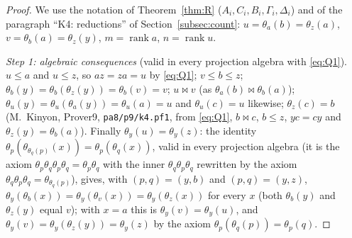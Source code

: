 \documentclass[11pt]{amsart}
\theoremstyle{definition}
\newcommand{\rk}{\operatorname{rank}}
\newcommand{\mt}{\bowtie}   %
\begin{document}
\begin{proof}
We use the notation of Theorem~\ref{thm:R} ($A_i,C_i,B_i,\Gamma_i,\Delta_i$) and of the paragraph ``K4: reductions'' of Section~\ref{subsec:count}: $u=\theta_a(b)=\theta_z(a)$, $v=\theta_b(a)=\theta_z(y)$, $m=\rk a$, $n=\rk u$.

\smallskip\emph{Step 1: algebraic consequences} (valid in every projection algebra with \eqref{eq:Q1}). $u\le a$ and $u\le z$, so $az=za=u$ by \eqref{eq:Q1}; $v\le b\le z$; $\theta_b(y)=\theta_b(\theta_z(y))=\theta_b(v)=v$; $u\mt v$ (as $\theta_a(b)\mt\theta_b(a)$); $\theta_u(y)=\theta_u(\theta_a(y))=\theta_u(a)=u$ and $\theta_u(c)=u$ likewise; $\theta_z(c)=b$ (M.~Kinyon, Prover9, \texttt{pa8/p9/k4.pf1}, from \eqref{eq:Q1}, $b\mt c$, $b\le z$, $yc=cy$ and $\theta_z(y)=\theta_b(a)$). Finally $\theta_y(u)=\theta_y(z)$: the identity $\theta_p(\theta_{\theta_q(p)}(x))=\theta_p(\theta_q(x))$, valid in every projection algebra (it is the axiom $\theta_p\theta_q\theta_p\theta_q=\theta_p\theta_q$ with the inner $\theta_q\theta_p\theta_q$ rewritten by the axiom $\theta_q\theta_p\theta_q=\theta_{\theta_q(p)}$), gives, with $(p,q)=(y,b)$ and $(p,q)=(y,z)$, $\theta_y(\theta_b(x))=\theta_y(\theta_v(x))=\theta_y(\theta_z(x))$ for every $x$ (both $\theta_b(y)$ and $\theta_z(y)$ equal $v$); with $x=a$ this is $\theta_y(v)=\theta_y(u)$, and $\theta_y(v)=\theta_y(\theta_z(y))=\theta_y(z)$ by the axiom $\theta_p(\theta_q(p))=\theta_p(q)$.


\end{proof}
\end{document}
